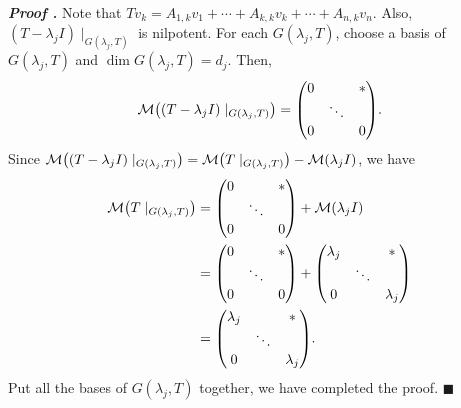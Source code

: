 \documentclass[11pt, letterpaper]{article}
\newcounter{nprf}[subsection]
\newenvironment*{prf}{\par\indent\textbf{\textit{Proof \stepcounter{nprf}\thenprf.}}}{\hfill$\blacksquare$\par}
\def\M{\mathcal{M}}
\begin{document}
\begin{prf}
	Note that $Tv_k=A_{1,k}v_1+\cdots+A_{k,k}v_k+\cdots+A_{n,k}v_n$. Also, $(T-\lambda_jI)\mid_{G(\lambda_j,T)}$ is nilpotent. For each $G(\lambda_j,T)$, choose a basis of $G(\lambda_j,T)$ and $\dim G(\lambda_j,T)=d_j$. Then, \[\M\qty((T-\lambda_jI)\mid_{G(\lambda_j,T)})=\mqty(0&&*\\&\ddots&\\0&&0).\] Since $\M\qty((T-\lambda_jI)\mid_{G(\lambda_j, T)})=\M\qty(T\mid_{G(\lambda_j, T)})-\M\qty(\lambda_jI)$, we have \[\begin{aligned}\M\qty(T\mid_{G(\lambda_j,T)})&=\mqty(0&&*\\&\ddots&\\0&&0)+\M\qty(\lambda_jI)\\&=\mqty(0&&*\\&\ddots&\\0&&0)+\mqty(\lambda_j&&*\\&\ddots&\\0&&\lambda_j)\\&=\mqty(\lambda_j&&*\\&\ddots&\\0&&\lambda_j).\end{aligned}\] Put all the bases of $G(\lambda_j,T)$ together, we have completed the proof. 
\end{prf}

\newpage
\end{document}
